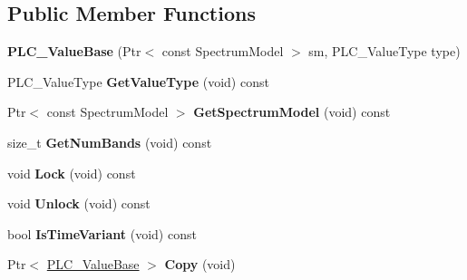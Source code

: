 \subsection*{\-Public \-Member \-Functions}
\begin{DoxyCompactItemize}
\item 
\hypertarget{classns3_1_1PLC__ValueBase_a86eb923e3dcf6669a080bdd81dd42970}{{\bfseries \-P\-L\-C\-\_\-\-Value\-Base} (\-Ptr$<$ const \-Spectrum\-Model $>$ sm, \-P\-L\-C\-\_\-\-Value\-Type type)}\label{classns3_1_1PLC__ValueBase_a86eb923e3dcf6669a080bdd81dd42970}

\item 
\hypertarget{classns3_1_1PLC__ValueBase_ac53469f956ea121d70d0c5be54b5a552}{\-P\-L\-C\-\_\-\-Value\-Type {\bfseries \-Get\-Value\-Type} (void) const }\label{classns3_1_1PLC__ValueBase_ac53469f956ea121d70d0c5be54b5a552}

\item 
\hypertarget{classns3_1_1PLC__ValueBase_a5d3e4f116b8aae6e20e6ca682f85164c}{\-Ptr$<$ const \-Spectrum\-Model $>$ {\bfseries \-Get\-Spectrum\-Model} (void) const }\label{classns3_1_1PLC__ValueBase_a5d3e4f116b8aae6e20e6ca682f85164c}

\item 
\hypertarget{classns3_1_1PLC__ValueBase_ad9b926e6254a94ad392e4a25c876a5b4}{size\-\_\-t {\bfseries \-Get\-Num\-Bands} (void) const }\label{classns3_1_1PLC__ValueBase_ad9b926e6254a94ad392e4a25c876a5b4}

\item 
\hypertarget{classns3_1_1PLC__ValueBase_a114798be562dd3a3a7a719fa877cf11a}{void {\bfseries \-Lock} (void) const }\label{classns3_1_1PLC__ValueBase_a114798be562dd3a3a7a719fa877cf11a}

\item 
\hypertarget{classns3_1_1PLC__ValueBase_a396855838da89e7f508fafdf56942f56}{void {\bfseries \-Unlock} (void) const }\label{classns3_1_1PLC__ValueBase_a396855838da89e7f508fafdf56942f56}

\item 
\hypertarget{classns3_1_1PLC__ValueBase_a253772117d6c84d6a9901a73dae13dfa}{bool {\bfseries \-Is\-Time\-Variant} (void) const }\label{classns3_1_1PLC__ValueBase_a253772117d6c84d6a9901a73dae13dfa}

\item 
\hypertarget{classns3_1_1PLC__ValueBase_a419f1eae4b67b9b463a837eb1efed152}{\-Ptr$<$ \hyperlink{classns3_1_1PLC__ValueBase}{\-P\-L\-C\-\_\-\-Value\-Base} $>$ {\bfseries \-Copy} (void)}\label{classns3_1_1PLC__ValueBase_a419f1eae4b67b9b463a837eb1efed152}

\end{DoxyCompactItemize}
